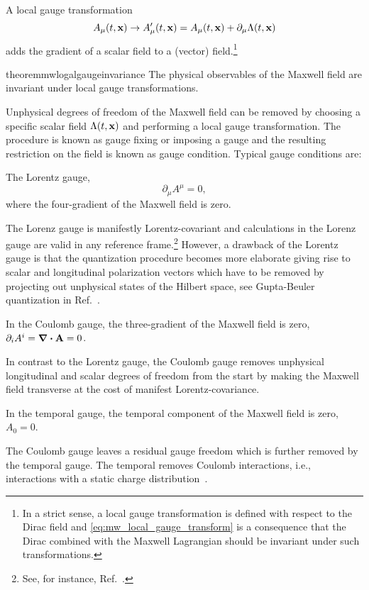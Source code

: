 \begin{definition}
	A local gauge transformation
	\begin{equation}
		A_\mu(t,\vb{x})
		\to
		A_\mu^\prime(t,\vb{x})
		=
		A_\mu(t,\vb{x})
		+
		\partial_\mu\Lambda(t,\vb{x})
		\label{eq:mw_local_gauge_transform}
	\end{equation}
	adds the gradient of a scalar field to a (vector) field.\footnote{In a strict sense, a local gauge transformation is defined with respect to the Dirac field and \cref{eq:mw_local_gauge_transform} is a consequence that the Dirac combined with the Maxwell Lagrangian should be invariant under such transformations.}
\end{definition}
\begin{restatable}{theorem}{mwlogalgaugeinvariance}\label{thm:mw_local_gauge_invariance}
	The physical observables of the Maxwell field are invariant under local gauge transformations.
\end{restatable}
Unphysical degrees of freedom of the Maxwell field can be removed by choosing a specific scalar field $\Lambda(t,\vb{x})$ and performing a local gauge transformation.
The procedure is known as gauge fixing or imposing a gauge and the resulting restriction on the field is known as gauge condition.
Typical gauge conditions are:
\begin{definition}
	The Lorentz gauge,
	\begin{equation}
		\partial_\mu
		A^\mu
		=
		0
		,
	\end{equation}
	where the four-gradient of the Maxwell field is zero.
\end{definition}
The Lorenz gauge is manifestly Lorentz-covariant and calculations in the Lorenz gauge are valid in any reference frame.\footnote{See, for instance, Ref.~\cite[p.~144]{Greiner2013}.}
However, a drawback of the Lorentz gauge is that the quantization procedure becomes more elaborate giving rise to scalar and longitudinal polarization vectors which have to be removed by projecting out unphysical states of the Hilbert space, see Gupta-Beuler quantization in Ref.~\cite[p.~180]{Greiner2013}.
\begin{definition}
	In the Coulomb gauge, the three-gradient of the Maxwell field is zero, $\partial_iA^i=\div\vb{A}=0$.
\end{definition}
In contrast to the Lorentz gauge, the Coulomb gauge removes unphysical longitudinal and scalar degrees of freedom from the start by making the Maxwell field transverse at the cost of manifest Lorentz-covariance.
\begin{definition}
	In the temporal gauge, the temporal component of the Maxwell field is zero, $A_0=0$.
\end{definition}
The Coulomb gauge leaves a residual gauge freedom which is further removed by the temporal gauge.
The temporal removes Coulomb interactions, i.e., interactions with a static charge distribution~\cite[p.~200]{Greiner2013}.

